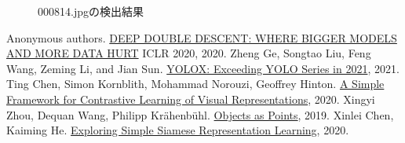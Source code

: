 \documentclass[a4j]{ujarticle}
\begin{document}
    \begin{figure}[h]
        \centering
        \label{fig:000814}
        \caption{000814.jpgの検出結果}
    \end{figure}

    \begin{thebibliography}{9}
         Anonymous authors. \href{https://openreview.net/attachment?id=B1g5sA4twr&name=original_pdf}{DEEP DOUBLE DESCENT: WHERE BIGGER MODELS AND MORE DATA HURT} ICLR 2020, 2020.
         Zheng Ge, Songtao Liu, Feng Wang, Zeming Li, and Jian Sun. \href{https://arxiv.org/pdf/2107.08430.pdf}{YOLOX: Exceeding YOLO Series in 2021}, 2021.
         Ting Chen, Simon Kornblith, Mohammad Norouzi, Geoffrey Hinton. \href{https://arxiv.org/pdf/2002.05709.pdf}{A Simple Framework for Contrastive Learning of Visual Representations}, 2020.
         Xingyi Zhou, Dequan Wang, Philipp Krähenbühl.
        \href{https://arxiv.org/pdf/1904.07850.pdf}{Objects as Points}, 2019.
         Xinlei Chen, Kaiming He. \href{https://arxiv.org/pdf/2011.10566.pdf}{Exploring Simple Siamese Representation Learning}, 2020.
    \end{thebibliography}
\end{document}
